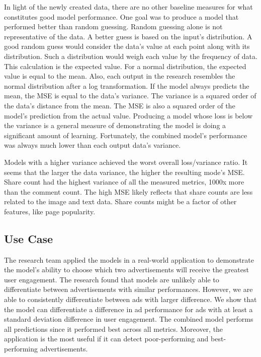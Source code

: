 \documentclass[mksc,blindrev]{informs3} %
\begin{document}
In light of the newly created data, there are no other baseline measures for what constitutes good model performance. One goal was to produce a model that performed better than random guessing. Random guessing alone is not representative of the data. A better guess is based on the input's distribution. A good random guess would consider the data's value at each point along with its distribution. Such a distribution would weigh each value by the frequency of data. This calculation is the expected value. For a normal distribution, the expected value is equal to the mean. Also, each output in the research resembles the normal distribution after a log transformation. If the model always predicts the mean, the MSE is equal to the data's variance. The variance is a squared order of the data's distance from the mean. The MSE is also a squared order of the model's prediction from the actual value. Producing a model whose loss is below the variance is a general measure of demonstrating the model is doing a significant amount of learning. Fortunately, the combined model's performance was always much lower than each output data's variance.

Models with a higher variance achieved the worst overall loss/variance ratio.  It seems that the larger the data variance, the higher the resulting mode's MSE.  Share count had the highest variance of all the measured metrics, 1000x more than the comment count.  The high MSE likely reflects that share counts are less related to the image and text data. Share counts might be a factor of other features, like page popularity.

\subsection{Use Case}

The research team applied the models in a real-world application to demonstrate the model's ability to choose which two advertisements will receive the greatest user engagement. The research found that models are unlikely able to differentiate between advertisements with similar performances. However, we are able to consistently differentiate between ads with larger difference. We show that the model can differentiate a difference in ad performance for ads with at least a standard deviation difference in user engagement. The combined model performs all predictions since it performed best across all metrics. Moreover, the application is the most useful if it can detect poor-performing and best-performing advertisements.
\end{document}
